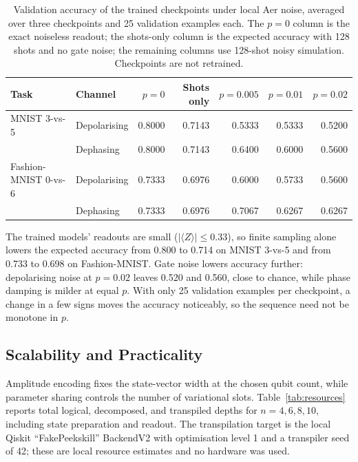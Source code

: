 \documentclass[conference]{IEEEtran}
\begin{document}
\begin{table}[!t]
\caption{Validation accuracy of the trained checkpoints under local Aer noise, averaged over three checkpoints and 25 validation examples each. The $p=0$ column is the exact noiseless readout; the shots-only column is the expected accuracy with 128 shots and no gate noise; the remaining columns use 128-shot noisy simulation. Checkpoints are not retrained.}
\label{tab:noise}
\centering
\small
\begin{tabular}{@{}llrrrrr@{}}
\toprule
\textbf{Task} & \textbf{Channel} & \textbf{$p=0$} & \textbf{Shots only} & \textbf{$p=0.005$} & \textbf{$p=0.01$} & \textbf{$p=0.02$} \\
\midrule
MNIST 3-vs-5 & Depolarising & 0.8000 & 0.7143 & 0.5333 & 0.5333 & 0.5200 \\
 & Dephasing & 0.8000 & 0.7143 & 0.6400 & 0.6000 & 0.5600 \\
Fashion-MNIST 0-vs-6 & Depolarising & 0.7333 & 0.6976 & 0.6000 & 0.5733 & 0.5600 \\
 & Dephasing & 0.7333 & 0.6976 & 0.7067 & 0.6267 & 0.6267 \\
\bottomrule
\end{tabular}
\end{table}

The trained models' readouts are small ($|\langle Z\rangle|\le0.33$), so finite sampling alone lowers the expected accuracy from 0.800 to 0.714 on MNIST 3-vs-5 and from 0.733 to 0.698 on Fashion-MNIST. Gate noise lowers accuracy further: depolarising noise at $p=0.02$ leaves 0.520 and 0.560, close to chance, while phase damping is milder at equal $p$. With only 25 validation examples per checkpoint, a change in a few signs moves the accuracy noticeably, so the sequence need not be monotone in $p$.

\subsection{Scalability and Practicality}
Amplitude encoding fixes the state-vector width at the chosen qubit count, while parameter sharing controls the number of variational slots. Table~\ref{tab:resources} reports total logical, decomposed, and transpiled depths for $n=4,6,8,10$, including state preparation and readout. The transpilation target is the local Qiskit ``FakePeekskill'' BackendV2 with optimisation level 1 and a transpiler seed of 42; these are local resource estimates and no hardware was used.
\end{document}
